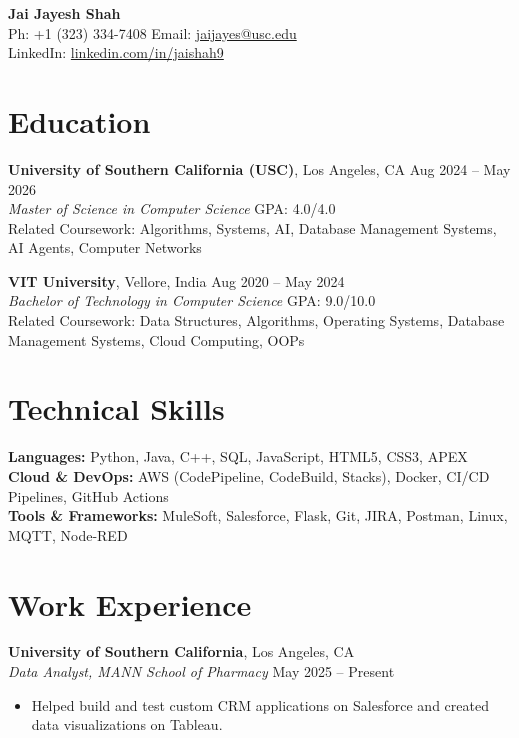 \documentclass[letterpaper,10pt]{article}
\begin{document}
\begin{center}
    {\LARGE \textbf{Jai Jayesh Shah}} \\
    \vspace{5pt}
    \small
    Ph: +1 (323) 334-7408 \quad Email: \href{mailto:jaijayes@usc.edu}{jaijayes@usc.edu} \\
    LinkedIn: \href{https://www.linkedin.com/in/jaishah9}{linkedin.com/in/jaishah9} \\
    \vspace{-8pt}
\end{center}

\section*{Education}
\textbf{University of Southern California (USC)}, Los Angeles, CA \hfill Aug 2024 -- May 2026 \\
\textit{Master of Science in Computer Science} \hfill GPA: 4.0/4.0 \\
Related Coursework: Algorithms, Systems, AI, Database Management Systems, AI Agents, Computer Networks

\vspace{2pt}

\textbf{VIT University}, Vellore, India \hfill Aug 2020 -- May 2024 \\
\textit{Bachelor of Technology in Computer Science} \hfill GPA: 9.0/10.0 \\
Related Coursework: Data Structures, Algorithms, Operating Systems, Database Management Systems, Cloud Computing, OOPs

\section*{Technical Skills}
\textbf{Languages:} Python, Java, C++, SQL, JavaScript, HTML5, CSS3, APEX \\
\textbf{Cloud \& DevOps:} AWS (CodePipeline, CodeBuild, Stacks), Docker, CI/CD Pipelines, GitHub Actions \\
\textbf{Tools \& Frameworks:} MuleSoft, Salesforce, Flask, Git, JIRA, Postman, Linux, MQTT, Node-RED

\section*{Work Experience}
\textbf{University of Southern California}, Los Angeles, CA \\
\textit{Data Analyst, MANN School of Pharmacy} \hfill May 2025 -- Present
\begin{itemize} \itemsep -2pt
    \item Helped build and test custom CRM applications on Salesforce and created data visualizations on Tableau.
\end{itemize}
\end{document}
